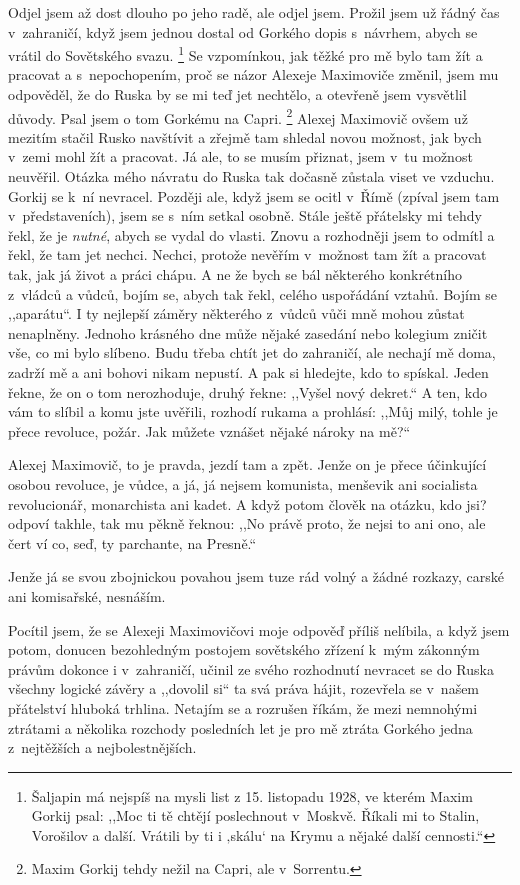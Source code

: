 Odjel jsem až dost dlouho po jeho radě, ale odjel jsem. Prožil jsem už řádný čas v zahraničí, když jsem jednou dostal od Gorkého dopis s návrhem, abych se vrátil do Sovětského svazu. \footnote{Šaljapin má nejspíš na mysli list z 15. listopadu 1928, ve kterém Maxim Gorkij psal: ,,Moc ti tě chtějí poslechnout v Moskvě. Říkali mi to Stalin, Vorošilov a další. Vrátili by ti i ‚skálu‘ na Krymu a nějaké další cennosti.``} Se vzpomínkou, jak těžké pro mě bylo tam žít a pracovat a s nepochopením, proč se názor Alexeje Maximoviče změnil, jsem mu odpověděl, že do Ruska by se mi teď jet nechtělo, a otevřeně jsem vysvětlil důvody. Psal jsem o tom Gorkému na Capri. \footnote{Maxim Gorkij tehdy nežil na Capri, ale v Sorrentu.} Alexej Maximovič ovšem už mezitím stačil Rusko navštívit a zřejmě tam shledal novou možnost, jak bych v zemi mohl žít a pracovat. Já ale, to se musím přiznat, jsem v tu možnost neuvěřil. Otázka mého návratu do Ruska tak dočasně zůstala viset ve vzduchu. Gorkij se k ní nevracel. Později ale, když jsem se ocitl v Římě (zpíval jsem tam v představeních), jsem se s ním setkal osobně. Stále ještě přátelsky mi tehdy řekl, že je \textit{nutné}, abych se vydal do vlasti. Znovu a rozhodněji jsem to odmítl a řekl, že tam jet nechci. Nechci, protože nevěřím v možnost tam žít a pracovat tak, jak já život a práci chápu. A ne že bych se bál některého konkrétního z vládců a vůdců, bojím se, abych tak řekl, celého uspořádání vztahů. Bojím se ,,aparátu``. I ty nejlepší záměry některého z vůdců vůči mně mohou zůstat nenaplněny. Jednoho krásného dne může nějaké zasedání nebo kolegium zničit vše, co mi bylo slíbeno. Budu třeba chtít jet do zahraničí, ale nechají mě doma, zadrží mě a ani bohovi nikam nepustí. A pak si hledejte, kdo to spískal. Jeden řekne, že on o tom nerozhoduje, druhý řekne: ,,Vyšel nový dekret.`` A ten, kdo vám to slíbil a komu jste uvěřili, rozhodí rukama a prohlásí: ,,Můj milý, tohle je přece revoluce, požár. Jak můžete vznášet nějaké nároky na mě?`` 

Alexej Maximovič, to je pravda, jezdí tam a zpět. Jenže on je přece účinkující osobou revoluce, je vůdce, a já, já nejsem komunista, menševik ani socialista revolucionář, monarchista ani kadet. A když potom člověk na otázku, kdo jsi? odpoví takhle, tak mu pěkně řeknou: ,,No právě proto, že nejsi to ani ono, ale čert ví co, seď, ty parchante, na Presně.``

Jenže já se svou zbojnickou povahou jsem tuze rád volný a žádné rozkazy, carské ani komisařské, nesnáším.

Pocítil jsem, že se Alexeji Maximovičovi moje odpověď příliš nelíbila, a když jsem potom, donucen bezohledným postojem sovětského zřízení k mým zákonným právům dokonce i v zahraničí, učinil ze svého rozhodnutí nevracet se do Ruska všechny logické závěry a ,,dovolil si`` ta svá práva hájit, rozevřela se v našem přátelství hluboká trhlina. Netajím se a rozrušen říkám, že mezi nemnohými ztrátami a několika rozchody posledních let je pro mě ztráta Gorkého jedna z nejtěžších a nejbolestnějších. 

